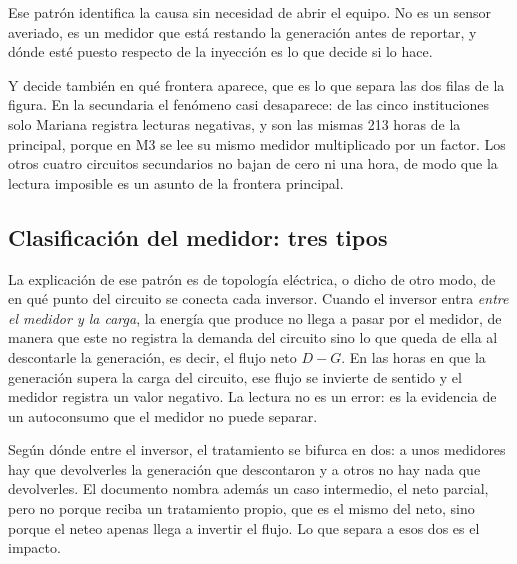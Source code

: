 Ese patrón identifica la causa sin necesidad de abrir el equipo. No es un
sensor averiado, es un medidor que está restando la generación antes de
reportar, y dónde esté puesto respecto de la inyección es lo que decide si
lo hace.

Y decide también en qué frontera aparece, que es lo que separa las dos
filas de la figura. En la secundaria el fenómeno casi desaparece: de las
cinco instituciones solo Mariana registra lecturas negativas, y son las
mismas \num{213} horas de la principal, porque en M3 se lee su mismo
medidor multiplicado por un factor. Los otros cuatro circuitos secundarios
no bajan de cero ni una hora, de modo que la lectura imposible es un
asunto de la frontera principal.

\subsection{Clasificación del medidor: tres tipos}
\label{sub:prep-tipos}

La explicación de ese patrón es de topología eléctrica, o dicho de otro
modo, de en qué punto del circuito se conecta cada inversor. Cuando el
inversor entra \emph{entre el medidor y la carga}, la energía que produce
no llega a pasar por el medidor, de manera que este no registra la demanda
del circuito sino lo que queda de ella al descontarle la generación, es
decir, el flujo neto $D - G$. En las horas en que la generación supera la
carga del circuito, ese flujo se invierte de sentido y el medidor registra
un valor negativo. La lectura no es un
error: es la evidencia de un autoconsumo que el medidor no puede separar.

Según dónde entre el inversor, el tratamiento se bifurca en dos: a unos
medidores hay que devolverles la generación que descontaron y a otros no
hay nada que devolverles. El documento nombra además un caso intermedio,
el neto parcial, pero no porque reciba un tratamiento propio, que es el
mismo del neto, sino porque el neteo apenas llega a invertir el flujo. Lo
que separa a esos dos es el impacto.

